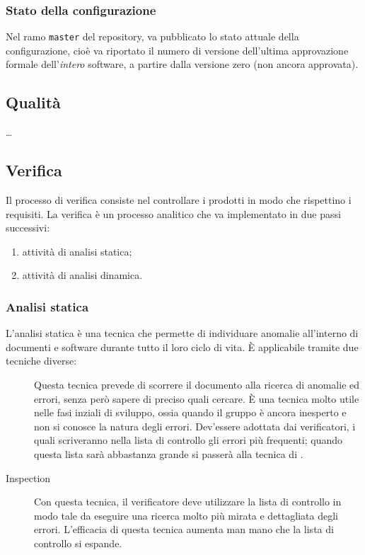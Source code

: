 \subsubsection{Stato della configurazione}
Nel ramo \texttt{master} del repository, va pubblicato lo stato attuale della configurazione, cioè va riportato il numero di versione dell'ultima approvazione formale dell'\emph{intero} software, a partire dalla versione zero (non ancora approvata).



\subsection{Qualità} \dots

\subsection{Verifica}
Il processo di verifica consiste nel controllare i prodotti in modo che rispettino i requisiti. %
La verifica è un processo analitico che va implementato in due passi successivi:
\begin{enumerate}
	\item attività di analisi statica;
	\item attività di analisi dinamica.
\end{enumerate}


	\subsubsection{Analisi statica}
	L'analisi statica è una tecnica che permette di individuare anomalie all'interno di documenti e software durante tutto il loro ciclo di vita. È applicabile tramite due tecniche diverse:
	\begin{description}
		\item[] Questa tecnica prevede di scorrere il documento alla ricerca di anomalie ed errori, senza però sapere di preciso quali cercare. È una tecnica molto utile nelle fasi inziali di sviluppo, ossia quando il gruppo è ancora inesperto e non si conosce la natura degli errori. Dev'essere adottata dai verificatori, i quali scriveranno nella lista di controllo gli errori più frequenti; quando questa lista sarà abbastanza grande si passerà alla tecnica di .
		\item[Inspection] Con questa tecnica, il verificatore deve utilizzare la lista di controllo in modo tale da eseguire una ricerca molto più mirata e dettagliata degli errori. L'efficacia di questa tecnica aumenta man mano che la lista di controllo si espande.
	\end{description}
 
